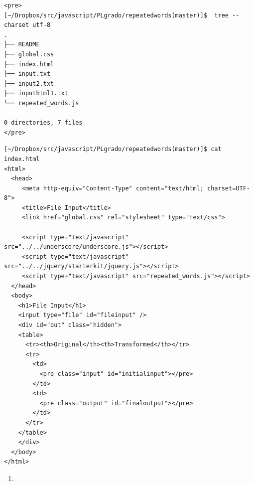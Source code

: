 
\begin{verbatim}
<pre>
[~/Dropbox/src/javascript/PLgrado/repeatedwords(master)]$  tree --charset utf-8 
.
├── README
├── global.css
├── index.html
├── input.txt
├── input2.txt
├── inputhtml1.txt
└── repeated_words.js

0 directories, 7 files
</pre>
\end{verbatim}

\begin{verbatim}
[~/Dropbox/src/javascript/PLgrado/repeatedwords(master)]$ cat index.html 
<html>
  <head>
     <meta http-equiv="Content-Type" content="text/html; charset=UTF-8">
     <title>File Input</title>
     <link href="global.css" rel="stylesheet" type="text/css">

     <script type="text/javascript" src="../../underscore/underscore.js"></script>
     <script type="text/javascript" src="../../jquery/starterkit/jquery.js"></script>
     <script type="text/javascript" src="repeated_words.js"></script>
  </head>
  <body>
    <h1>File Input</h1>
    <input type="file" id="fileinput" />
    <div id="out" class="hidden">
    <table>
      <tr><th>Original</th><th>Transformed</th></tr>
      <tr>
        <td>
          <pre class="input" id="initialinput"></pre>
        </td>
        <td>
          <pre class="output" id="finaloutput"></pre>
        </td>
      </tr>
    </table>
    </div>
  </body>
</html>
\end{verbatim}

\begin{enumerate}
\item 
{}
\end{enumerate}

